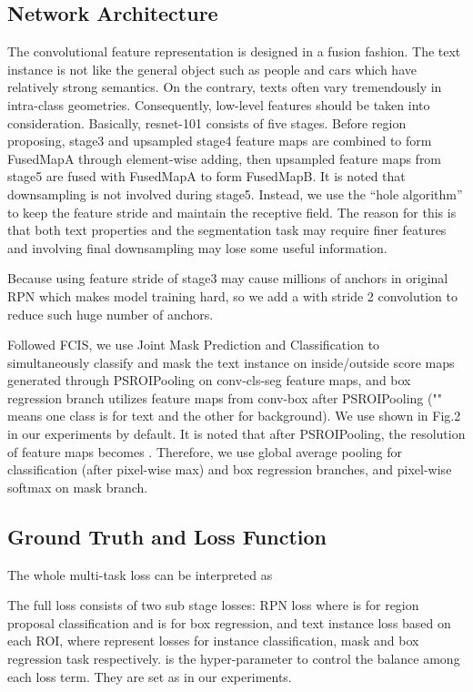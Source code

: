 \documentclass[a4paper,conference]{IEEEtran}
\begin{document}
\subsection{Network Architecture}
The convolutional feature representation is designed in a fusion fashion. The text instance is not like the general object such as people and cars which have relatively strong semantics. On the  contrary, texts often vary tremendously in intra-class geometries. Consequently, low-level features should be taken into consideration. Basically, resnet-101 consists of five stages. Before region proposing, stage3 and upsampled stage4 feature maps are combined to form FusedMapA through element-wise adding, then upsampled feature maps from stage5 are fused with FusedMapA to form FusedMapB. It is noted that downsampling is not involved during stage5. Instead, we use the “hole algorithm”\cite{chen2016deeplab,long2015fully} to keep the feature stride and maintain the receptive field. The reason for this is that both text properties and the segmentation task may require finer features and involving final downsampling may lose some useful information.

Because using feature stride of stage3 may cause  millions of anchors in original RPN\cite{Ren2017Faster} which makes model training hard, so we add a  with stride 2 convolution to reduce such huge number of anchors.

Followed FCIS\cite{li2016fully}, we use Joint Mask Prediction and Classification to simultaneously classify and mask the text instance on  inside/outside score maps generated through PSROIPooling on conv-cls-seg feature maps, and box regression branch utilizes   feature maps from conv-box after PSROIPooling ("" means one class is for text and the other for background). We use   shown in Fig.2 in our experiments by default. It is noted that after PSROIPooling, the resolution of feature maps becomes  . Therefore, we use global average pooling\cite{lin2013network} for classification (after pixel-wise max) and box regression branches, and pixel-wise softmax on mask branch.  
\subsection{Ground Truth and Loss Function}
The whole multi-task loss  can be interpreted as 




The full loss  consists of two sub stage losses: RPN loss  where  is for region proposal classification and  is for box regression, and text instance loss  based on each ROI, where  represent losses for instance classification, mask and box regression task respectively.  is the hyper-parameter to control the balance among each loss term. They are set as   in our experiments.
\end{document}
